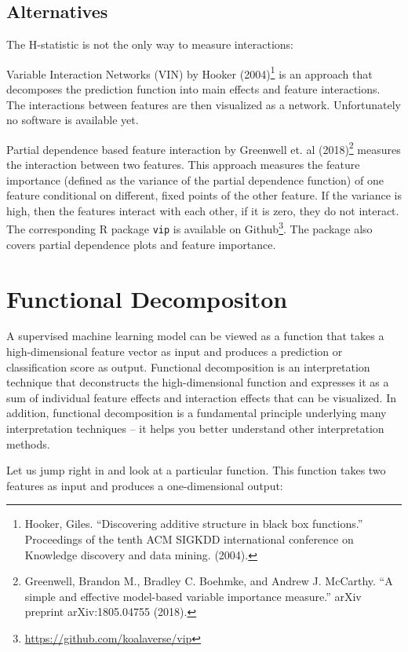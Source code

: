 \documentclass[
  12pt,
]{krantz}
\renewcommand{\href}[2]{#2\footnote{\url{#1}}}
\begin{document}
\hypertarget{alternatives}{%
\subsection{Alternatives}\label{alternatives}}

The H-statistic is not the only way to measure interactions:

Variable Interaction Networks (VIN) by Hooker (2004)\footnote{Hooker, Giles. ``Discovering additive structure in black box functions.'' Proceedings of the tenth ACM SIGKDD international conference on Knowledge discovery and data mining. (2004).} is an approach that decomposes the prediction function into main effects and feature interactions.
The interactions between features are then visualized as a network.
Unfortunately no software is available yet.

Partial dependence based feature interaction by Greenwell et. al (2018)\footnote{Greenwell, Brandon M., Bradley C. Boehmke, and Andrew J. McCarthy. ``A simple and effective model-based variable importance measure.'' arXiv preprint arXiv:1805.04755 (2018).} measures the interaction between two features.
This approach measures the feature importance (defined as the variance of the partial dependence function) of one feature conditional on different, fixed points of the other feature.
If the variance is high, then the features interact with each other, if it is zero, they do not interact.
The corresponding R package \texttt{vip} is available on \href{https://github.com/koalaverse/vip}{Github}.
The package also covers partial dependence plots and feature importance.

\hypertarget{decomposition}{%
\section{Functional Decompositon}\label{decomposition}}

A supervised machine learning model can be viewed as a function that takes a high-dimensional feature vector as input and produces a prediction or classification score as output.
Functional decomposition is an interpretation technique that deconstructs the high-dimensional function and expresses it as a sum of individual feature effects and interaction effects that can be visualized.
In addition, functional decomposition is a fundamental principle underlying many interpretation techniques -- it helps you better understand other interpretation methods.

Let us jump right in and look at a particular function.
This function takes two features as input and produces a one-dimensional output:
\end{document}
